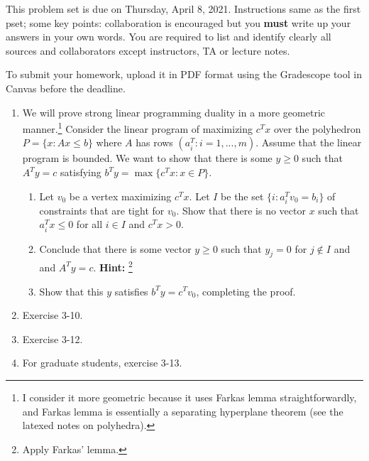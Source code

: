 \documentclass[12pt]{article} 
\begin{document}

\medskip
This problem set is due on Thursday, April 8, 2021. Instructions same as the first pset; some key points: collaboration is encouraged but you {\bf must} write up
your answers in your own words. You are required to list and identify clearly all sources and collaborators except instructors, TA or lecture notes.  %

To submit your homework, upload it in PDF format using the Gradescope tool in Canvas before the deadline.

\begin{enumerate}
\item We will prove strong linear programming duality in a more geometric manner.\footnote{I consider it more geometric because it uses Farkas lemma straightforwardly, and Farkas lemma is essentially a separating hyperplane theorem (see the latexed notes on polyhedra).} Consider the linear program of maximizing $c^T x$ over the polyhedron $P = \{x:Ax \leq b\}$ where $A$ has rows $(a_i^T: i =1,...,m)$. Assume that the linear program is bounded. We want to show that there is some $y \geq 0$ such that $A^T y = c$ satisfying $b^T y = \max \{c^T x: x \in P\}$. 
\begin{enumerate}
\item Let $v_0$ be a vertex maximizing $c^Tx$. Let $I$ be the set $\{i: a_i^T v_0 = b_i\}$ of constraints that are tight for $v_0$. Show that there is no vector $x$ such that $a_i^T x \leq 0$ for all $i \in I$ and $c^T x > 0$. 
\item Conclude that there is some vector $y \geq 0$ such that $y_j = 0$ for $j \not\in I$ and and $A^T y = c.$ \textbf{Hint: }\footnote{Apply Farkas' lemma.}
\item Show that this $y$ satisfies $b^T y = c^T v_0$, completing the proof.
\end{enumerate}
\item
Exercise 3-10.
\item
Exercise 3-12.
\item
For graduate students, exercise 3-13.

\end{enumerate}
\end{document}

